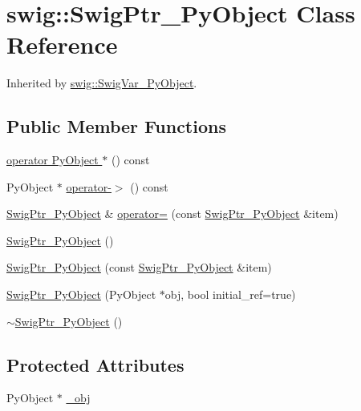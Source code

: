\hypertarget{classswig_1_1_swig_ptr___py_object}{}\section{swig\+:\+:Swig\+Ptr\+\_\+\+Py\+Object Class Reference}
\label{classswig_1_1_swig_ptr___py_object}


Inherited by \hyperlink{structswig_1_1_swig_var___py_object}{swig\+::\+Swig\+Var\+\_\+\+Py\+Object}.

\subsection*{Public Member Functions}
\begin{DoxyCompactItemize}
\item 
\hyperlink{classswig_1_1_swig_ptr___py_object_a488cefbaa1b44892dca63570d463f926}{operator Py\+Object $\ast$} () const
\item 
Py\+Object $\ast$ \hyperlink{classswig_1_1_swig_ptr___py_object_abcd310284d78ccf1041fb60906bc115e}{operator-\/$>$} () const
\item 
\hyperlink{classswig_1_1_swig_ptr___py_object}{Swig\+Ptr\+\_\+\+Py\+Object} \& \hyperlink{classswig_1_1_swig_ptr___py_object_a86d8657d6b4a27c8e9e6942bc1ba572c}{operator=} (const \hyperlink{classswig_1_1_swig_ptr___py_object}{Swig\+Ptr\+\_\+\+Py\+Object} \&item)
\item 
\hyperlink{classswig_1_1_swig_ptr___py_object_abf8e6dbea1c465582b210f732034b3ab}{Swig\+Ptr\+\_\+\+Py\+Object} ()
\item 
\hyperlink{classswig_1_1_swig_ptr___py_object_a4282f20207f8cd22c9b079203c832a04}{Swig\+Ptr\+\_\+\+Py\+Object} (const \hyperlink{classswig_1_1_swig_ptr___py_object}{Swig\+Ptr\+\_\+\+Py\+Object} \&item)
\item 
\hyperlink{classswig_1_1_swig_ptr___py_object_a4503d58d577d209f5e1fa67026852505}{Swig\+Ptr\+\_\+\+Py\+Object} (Py\+Object $\ast$obj, bool initial\+\_\+ref=true)
\item 
\hyperlink{classswig_1_1_swig_ptr___py_object_a3f2d2edd8a4eda4bf8a1243e50aa3849}{$\sim$\+Swig\+Ptr\+\_\+\+Py\+Object} ()
\end{DoxyCompactItemize}
\subsection*{Protected Attributes}
\begin{DoxyCompactItemize}
\item 
Py\+Object $\ast$ \hyperlink{classswig_1_1_swig_ptr___py_object_ae617c5726496db423cd19688e3264618}{\+\_\+obj}
\end{DoxyCompactItemize}


